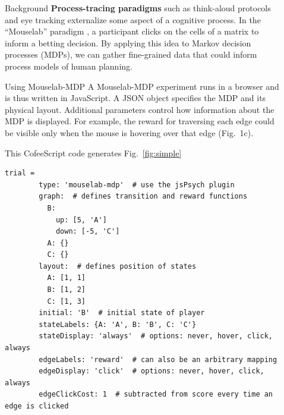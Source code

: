 \documentclass[final]{beamer}
\newlength{\sepwid}
\newlength{\onecolwid}
\newlength{\twocolwid}
\begin{document}
\begin{frame}[t, fragile]
\begin{columns}[t]
\begin{column}{\onecolwid}
\begin{block}{Background}
    \textbf{Process-tracing paradigms} such as think-aloud protocols and eye tracking externalize some aspect of a cognitive process.
    In the ``Mouselab'' paradigm \cite{Payne1988}, a participant clicks on the cells of a matrix to inform a betting decision.
    By applying this idea to Markov decision processes (MDPs), we can gather fine-grained data that could inform process models of human planning.

  \end{block}

  \begin{block}{Using Mouselab-MDP}\label{usage}
    A Mouselab-MDP experiment runs in a browser and is thus written in JavaScript.
    A JSON object specifies the MDP and its physical layout.
    Additional parameters control how information about the MDP is displayed.
    For example, the reward for traversing each edge could be visible only when the mouse is hovering over that edge (Fig.~1c).

    This CofeeScript code generates Fig.~\ref{fig:simple}
    \begin{Verbatim}[fontsize=\tiny]
      trial =
        type: 'mouselab-mdp'  # use the jsPsych plugin
        graph:  # defines transition and reward functions
          B:
            up: [5, 'A']
            down: [-5, 'C']
          A: {}
          C: {}
        layout:  # defines position of states
          A: [1, 1]
          B: [1, 2]
          C: [1, 3]
        initial: 'B'  # initial state of player
        stateLabels: {A: 'A', B: 'B', C: 'C'}
        stateDisplay: 'always'  # options: never, hover, click, always
        edgeLabels: 'reward'  # can also be an arbitrary mapping
        edgeDisplay: 'click'  # options: never, hover, click, always
        edgeClickCost: 1  # subtracted from score every time an edge is clicked
    \end{Verbatim}
  \end{block}

\end{column} %

\begin{column}{\sepwid}\end{column} %
\begin{column}{\twocolwid} %


\end{column}
\end{columns}
\end{frame}
\end{document}
